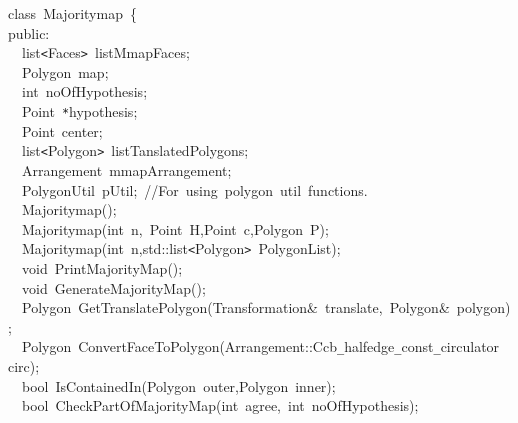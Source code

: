{
\noindent \ttfamily
\jttstylee class~\jttstylek Majoritymap~\jttstylei \{\\
\jttstylee public\jttstylek :\\
\jttstylea ~~\jttstylek list\verb#<#Faces\verb#>#~listMmapFaces;\\
\jttstylea ~~\jttstylek Polygon~map;\\
\jttstylea ~~\jttstylej int~\jttstylek noOfHypothesis;\\
\jttstylea ~~\jttstylek Point~\verb#*#hypothesis;\\
\jttstylea ~~\jttstylek Point~center;\\
\jttstylea ~~\jttstylek list\verb#<#Polygon\verb#>#~listTanslatedPolygons;\\
\jttstylea ~~\jttstylek Arrangement~mmapArrangement;\\
\jttstylea ~~\jttstylek PolygonUtil~pUtil;~\jttstyled //For~using~polygon~util~functions.\\
\jttstylea ~~\jttstylek Majoritymap\jttstylei ()\jttstylek ;\\
\jttstylea ~~\jttstylek Majoritymap\jttstylei (\jttstylej int~\jttstylek n,~Point~H\jttstylei []\jttstylek ,Point~c,Polygon~P\jttstylei )\jttstylek ;\\
\jttstylea ~~\jttstylek Majoritymap\jttstylei (\jttstylej int~\jttstylek n,std::list\verb#<#Polygon\verb#>#~PolygonList\jttstylei )\jttstylek ;\\
\jttstylea ~~\jttstylej void~\jttstylek PrintMajorityMap\jttstylei ()\jttstylek ;\\
\jttstylea ~~\jttstylej void~\jttstylek GenerateMajorityMap\jttstylei ()\jttstylek ;\\
\jttstylea ~~\jttstylek Polygon~GetTranslatePolygon\jttstylei (\jttstylek Transformation\&~translate,~Polygon\&~polygon\jttstylei )\jttstylek ;\\
\jttstylea ~~\jttstylek Polygon~ConvertFaceToPolygon\jttstylei (\jttstylek Arrangement::Ccb\verb#_#halfedge\verb#_#const\verb#_#circulator~circ\jttstylei )\jttstylek ;\\
\jttstylea ~~\jttstylek bool~IsContainedIn\jttstylei (\jttstylek Polygon~outer,Polygon~inner\jttstylei )\jttstylek ;\\
\jttstylea ~~\jttstylek bool~CheckPartOfMajorityMap\jttstylei (\jttstylej int~\jttstylek agree,~\jttstylej int~\jttstylek noOfHypothesis\jttstylei )\jttstylek ;\\
}
